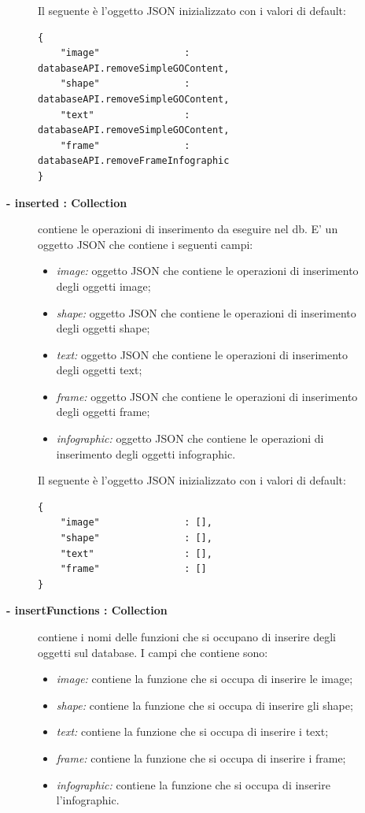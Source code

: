 \begin{description}
\begin{description}
			Il seguente è l'oggetto JSON inizializzato con i valori di default:
			\begin{lstlisting}
{
    "image"               : databaseAPI.removeSimpleGOContent,
    "shape"               : databaseAPI.removeSimpleGOContent,
    "text"                : databaseAPI.removeSimpleGOContent,
    "frame"               : databaseAPI.removeFrameInfographic 
}
			\end{lstlisting}					
	\item[\textbf{- inserted : Collection			}] \hfill
			contiene le operazioni di inserimento da eseguire nel db. E' un oggetto JSON che contiene i seguenti campi:
			\begin{itemize}
				\item \textit{image:} oggetto JSON che contiene le operazioni di inserimento degli oggetti image;
				\item \textit{shape:} oggetto JSON che contiene le operazioni di inserimento degli oggetti shape;
				\item \textit{text:} oggetto JSON che contiene le operazioni di inserimento degli oggetti text;
				\item \textit{frame:} oggetto JSON che contiene le operazioni di inserimento degli oggetti frame;
				\item \textit{infographic:} oggetto JSON che contiene le operazioni di inserimento degli oggetti infographic.
			\end{itemize}
			
			Il seguente è l'oggetto JSON inizializzato con i valori di default:
			\begin{lstlisting}
{
    "image"               : [],
    "shape"               : [],
    "text"                : [],
    "frame"               : [] 
}
			\end{lstlisting}	
			\item[\textbf{- insertFunctions : Collection			}] \hfill
			contiene i nomi delle funzioni che si occupano di inserire degli oggetti sul database. I campi che contiene sono:
			\begin{itemize}
				\item \textit{image:} contiene la funzione che si occupa di inserire le image;
				\item \textit{shape:} contiene la funzione che si occupa di inserire gli shape;
				\item \textit{text:} contiene la funzione che si occupa di inserire i text;
				\item \textit{frame:} contiene la funzione che si occupa di inserire i frame;
				\item \textit{infographic:} contiene la funzione che si occupa di inserire l'infographic.
			\end{itemize}


\end{description}
\end{description}
